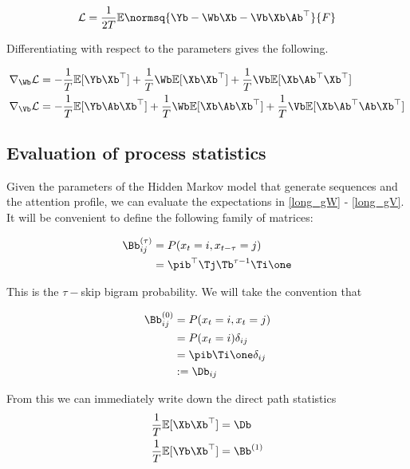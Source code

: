 \documentclass{article}
\begin{document}
\begin{equation}\label{loss}
     \mathcal{L} = \frac{1}{2T} \mathbb{E}\normsq{\Yb - \Wb \Xb - \Vb \Xb \Ab^\top}{F}
\end{equation}

Differentiating with respect to the parameters gives the following.

\begin{align}
     \nabla_{\Wb}\mathcal{L} &= - \frac{1}{T}\mathbb{E}[\Yb\Xb^\top] + \frac{1}{T}\Wb\mathbb{E}[\Xb\Xb^\top] + \frac{1}{T}\Vb\mathbb{E}[\Xb \Ab^\top\Xb^\top]  \label{long_gW}\\ 
     \nabla_{\Vb}\mathcal{L} &= - \frac{1}{T}\mathbb{E}[\Yb\Ab\Xb^\top] + \frac{1}{T}\Wb\mathbb{E}[\Xb\Ab\Xb^\top] + \frac{1}{T}\Vb\mathbb{E}[\Xb \Ab^\top\Ab\Xb^\top]\label{long_gV}
\end{align}

\subsection{Evaluation of process statistics}\label{sec:stats}
Given the parameters of the Hidden Markov model that generate sequences and the attention profile, we can evaluate the expectations in \eqref{long_gW} - \eqref{long_gV}. It will be convenient to define the following family of matrices:


\begin{align}
     \Bb^{(\tau)}_{ij} &= P(x_{t} = i, x_{t-\tau} = j) \label{btau}\\
     &= \pib^\top \Tj \Tb^{\tau-1} \Ti \one
\end{align}

This is the $\tau-$skip bigram probability. We will take the convention that 

\begin{align}
    \Bb^{(0)}_{ij} &= P(x_{t} = i, x_{t} = j) \label{b0}\\
    &= P(x_t = i)\delta_{ij}\\
    &= \pib \Ti \one \delta_{ij} \\
    &:= \Db_{ij}
\end{align}

From this we can immediately write down the direct path statistics
\begin{align}
    \frac{1}{T}\mathbb{E}[\Xb\Xb^\top] &= \Db \label{XX}\\
    \frac{1}{T}\mathbb{E}[\Yb\Xb^\top] &= \Bb^{(1)} \label{YX}
\end{align}
\end{document}
